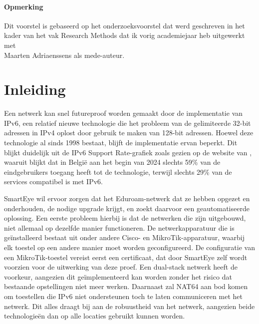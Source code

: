 

\paragraph{Opmerking}

Dit voorstel is gebaseerd op het onderzoeksvoorstel dat werd geschreven in het
kader van het vak Research Methods dat ik vorig academiejaar heb
uitgewerkt met \\ Maarten Adriaenssens als mede-auteur.


\section{Inleiding}%
\label{sec:inleiding}

Een netwerk kan snel futureproof worden gemaakt door de implementatie van IPv6, een relatief nieuwe technologie die het probleem van de gelimiteerde 32-bit adressen in IPv4 oplost
door gebruik te maken van 128-bit adressen. Hoewel deze technologie al sinds 1998 bestaat, blijft de implementatie ervan beperkt. 
Dit blijkt duidelijk uit de IPv6 Support Rate-grafiek zoals gezien op de website van \textcite{EuropeanCommission}, 
waaruit blijkt dat in België aan het begin van 2024 slechts 59\% van de eindgebruikers toegang heeft tot de technologie, 
terwijl slechts 29\% van de services compatibel is met IPv6.

SmartEye wil ervoor zorgen dat het Eduroam-netwerk dat ze hebben opgezet en onderhouden, de nodige upgrade krijgt, 
en zoekt daarvoor een geautomatiseerde oplossing. Een eerste probleem hierbij is dat de netwerken die zijn uitgebouwd, 
niet allemaal op dezelfde manier functioneren. De netwerkapparatuur die is geïnstalleerd bestaat uit onder andere Cisco- en MikroTik-apparatuur, 
waarbij elk toestel op een andere manier moet worden geconfigureerd.  
De configuratie van een MikroTik-toestel vereist eerst een certificaat, dat door SmartEye zelf wordt voorzien voor de uitwerking van deze proef. 
Een dual-stack netwerk heeft de voorkeur, aangezien dit geïmplementeerd kan worden zonder het risico dat bestaande opstellingen niet meer werken. 
Daarnaast zal NAT64 aan bod komen om toestellen die IPv6 niet ondersteunen toch te laten communiceren met het netwerk. Dit alles draagt bij aan de robuustheid van het netwerk, 
aangezien beide technologieën dan op alle locaties gebruikt kunnen worden. \\

